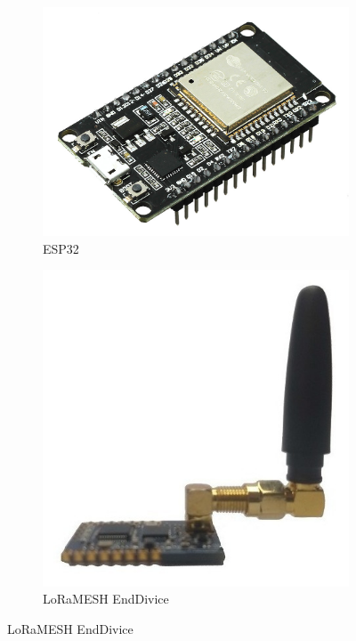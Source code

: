 \documentclass[
article,			%
12pt,				%
oneside,			%
a4paper,			%
english,			%
brazil,				%
sumario=tradicional
]{abntex2}
\begin{document}
\begin{figure}[h!]
  \centering
  \begin{subfigure}[b]{0.3\linewidth}
    \includegraphics[width=\linewidth]{esp}
    \caption{ESP32}
  \end{subfigure}
  \begin{subfigure}[b]{0.3\linewidth}
    \includegraphics[width=\linewidth]{lora}
    \caption{LoRaMESH EndDivice}

\end{subfigure}
\end{figure}
\end{document}
